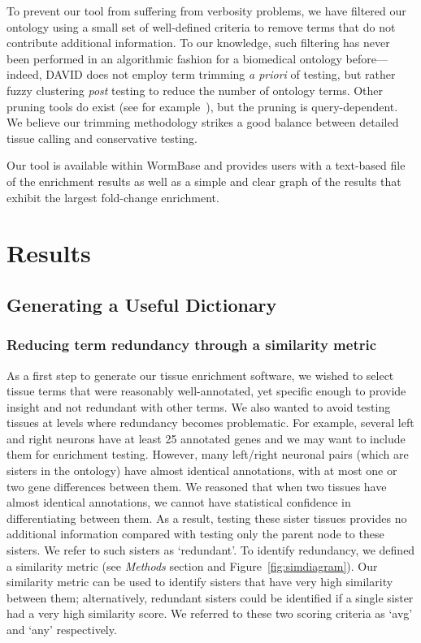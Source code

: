 \documentclass{bmcart}
\begin{document}
 To prevent our tool from suffering from verbosity problems, we have filtered our ontology using a small set of well-defined criteria to remove terms that do not contribute additional information. To our knowledge, such filtering has never been performed in an algorithmic fashion for a biomedical ontology before---indeed, DAVID does not employ term trimming \emph{a priori} of testing, but rather fuzzy clustering \emph{post} testing to reduce the number of ontology terms. Other pruning tools do exist (see for example~\cite{Kim2007}), but the pruning is query-dependent. We believe our trimming methodology strikes a good balance between detailed tissue calling and conservative testing.

Our tool is available within WormBase and provides users with a text-based file of the enrichment results as well as a simple and clear graph of the results that exhibit the largest fold-change enrichment.

\section*{Results}
\subsection*{Generating a Useful Dictionary}
\subsubsection*{Reducing term redundancy through a similarity metric}
As a first step to generate our tissue enrichment software, we wished to select tissue terms that were reasonably well-annotated, yet specific enough to provide insight and not redundant with other terms. We also wanted to avoid
testing tissues at levels where redundancy becomes problematic. For example, several left and right neurons have at least 25 annotated genes and we may want to include them for enrichment testing. However, many left/right neuronal
pairs (which are sisters in the ontology) have almost identical annotations, with at most one or two gene differences between them. We reasoned that when two tissues have almost identical annotations, we cannot have statistical confidence in differentiating between them. As a result, testing these sister tissues provides no additional information compared with testing only the parent node to these sisters. We refer to such sisters as `redundant'. To identify redundancy, we defined a similarity metric (see \emph{Methods} section and Figure~\ref{fig:simdiagram}). Our similarity metric can be used to identify sisters that have very high similarity between them; alternatively, redundant sisters could be identified if a single sister had a very high similarity score. We referred to these two scoring criteria as `avg' and `any' respectively.
\end{document}
